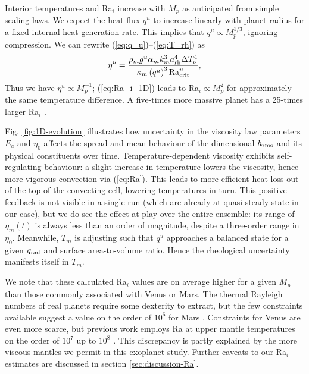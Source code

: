 Interior temperatures and Ra$_i$ increase with $M_p$ as anticipated from simple scaling laws. We expect the heat flux $q^u$ to increase linearly with planet radius for a fixed internal heat generation rate. This implies that $q^u \propto M_p^{1/3}$, ignoring compression. We can rewrite (\ref{eq:q_u})--(\ref{eq:T_rh}) as
\begin{equation}
    \eta^u = \frac{\rho_m g^u \alpha_m k_m^3 a^4_{\rm rh} \Delta T_\nu^4}{\kappa_m \left(q^u\right)^3 {\rm Ra}^u_{\rm crit}},
\end{equation}
Thus we have $\eta^u \propto M_p^{-1}$; (\ref{eq:Ra_i_1D}) leads to Ra$_i \propto M_p^2$ for approximately the same temperature difference. A five-times more massive planet has a 25-times larger Ra$_i$ \citep[see also][]{stevenson_styles_2003,  kite2009geodynamics}.


Fig. \ref{fig:1D-evolution} illustrates how uncertainty in the viscosity law parameters $E_a$ and $\eta_0$ affects the spread and mean behaviour of the dimensional $h_{\rm rms}$ and its physical constituents over time. Temperature-dependent viscosity exhibits self-regulating behaviour: a slight increase in temperature lowers the viscosity, hence more vigorous convection via (\ref{eq:Ra}). This leads to more efficient heat loss out of the top of the convecting cell, lowering temperatures in turn. This positive feedback is not visible in a single run (which are already at quasi-steady-state in our case), but we do see the effect at play over the entire ensemble: its range of $\eta_m(t)$ is always less than an order of magnitude, despite a three-order range in $\eta_0$. Meanwhile, $T_m$ is adjusting such that $q^u$ approaches a balanced state for a given $q_{\rm rad}$ and surface area-to-volume ratio. Hence the rheological uncertainty manifests itself in $T_m$. 

We note that these calculated Ra$_i$ values are on average higher for a given $M_p$ than those commonly associated with Venus or Mars. The thermal Rayleigh numbers of real planets require some dexterity to extract, but the few constraints available suggest a value on the order of $10^6$ for Mars \citep{kiefer_melting_2003, samuel_rheology_2019}. Constraints for Venus are even more scarce, but previous work employs Ra at upper mantle temperatures on the order of $10^7$ up to $10^8$ \citep{huang_constraints_2013, king_venus_2018}. This discrepancy is partly explained by the more viscous mantles we permit in this exoplanet study. Further caveats to our Ra$_i$ estimates are discussed in section \ref{sec:discussion-Ra}.

